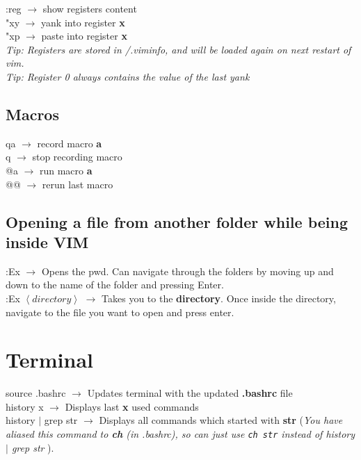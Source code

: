\documentclass[twoside,a4paper]{article}
\newcommand{\tcb}{\color{blue}} \newcommand{\tcc}{\color{cyan}} \newcommand{\tcr}{\color{red}}
\newcommand{\tcg}{\color{gray}} \newcommand{\tco}{\color{orange}} \newcommand{\tcp}{\color{purple}}
\newcommand{\tck}{\color{black}}
\newcommand{\ra }{$\rightarrow$ }
\newcommand{\hs}{\hspace}
\begin{document}
\begin{multicols}{2}
    \tcr :reg \tck \ra show registers content\\
    \tcr "xy \tck \ra yank into register \textbf{x}\\
    \tcr "xp \tck \ra paste into register \textbf{x}\\

    \tcg \textit{Tip: Registers are stored in /.viminfo, and will be loaded again on next restart of
        vim.}\\
    \textit{Tip: Register 0 always contains the value of the last yank}

    \tcc \subsection{Macros}

    \tcr qa \tck \ra record macro \textbf{a}\\
    \tcr q \tck \ra stop recording macro\\
    \tcr @a \tck \ra run macro \textbf{a}\\
    \tcr @@ \tck \ra rerun last macro

    \tcc \subsection{Opening a file from another folder while being inside VIM} \tcr :Ex \tck \ra
        Opens the pwd. Can navigate through the folders by moving up and down to the name of the
        folder and pressing Enter.\\
    \tcr :Ex \color{ blue} $\left< directory \right>$ \tck \ra Takes you to the \textbf{directory}.
    Once inside the directory, navigate to the file you want to open and press enter.
    \newpage
    \tcc \section{Terminal} \hs{-0.5 cm}\tcr  source \tcb  .bashrc \tck \ra Updates terminal with
    the updated \textbf{.bashrc} file\\
    \tcr history \tcb  x \tck \ra Displays last \textbf{x} used commands\\
    \tcr history \tcb  $\vert$ grep str \tck \ra Displays all commands which started with
    \textbf{str} (\tcg  \textit{You have aliased this command to \textbf{ch} (in .bashrc), so can
    just use \texttt{ch str} instead of history $\vert$ grep str} ).\\


\end{multicols}
\end{document}
